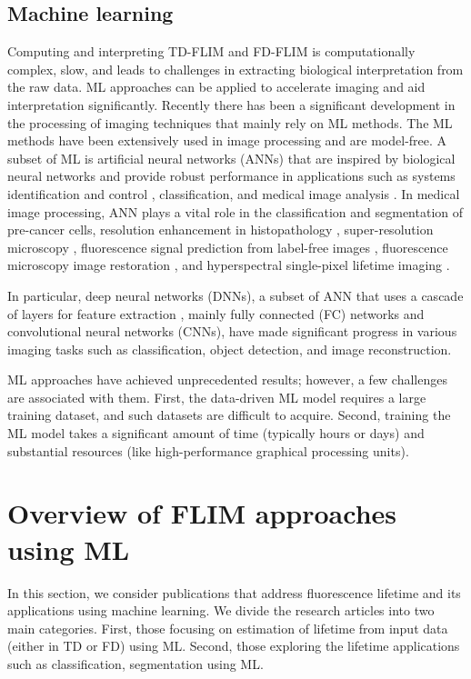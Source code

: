 \documentclass[12pt]{iopart}
\begin{document}
\subsection{Machine learning} \label{ml}
Computing and interpreting TD-FLIM and FD-FLIM is computationally complex, slow, and leads to challenges in extracting biological interpretation from the raw data. ML approaches can be applied to accelerate imaging and aid interpretation significantly. Recently there has been a significant development in the processing of imaging techniques that mainly rely on ML methods. The ML methods have been extensively used in image processing and are model-free. A subset of ML is artificial neural networks (ANNs) that are inspired by biological neural networks and provide robust performance in applications such as systems identification and control \cite{control_ann}, classification, and medical image analysis \cite{ann_medical}. In medical image processing, ANN plays a vital role in the classification and segmentation of pre-cancer cells, resolution enhancement in histopathology \cite{histopath_ann}, super-resolution microscopy \cite{sr_ann}, fluorescence signal prediction from label-free images \cite{label_free_ann}, fluorescence microscopy image restoration \cite{restoration_ann}, and hyperspectral single-pixel lifetime imaging \cite{netflics1}.

In particular, deep neural networks (DNNs), a subset of ANN that uses a cascade of layers for feature extraction \cite{goodfellow2016deep}, mainly fully connected (FC) networks and convolutional neural networks (CNNs), have made significant progress in various imaging tasks such as classification, object detection, and image reconstruction. 

ML approaches have achieved unprecedented results; however, a few challenges are associated with them. First, the data-driven ML model requires a large training dataset, and such datasets are difficult to acquire. Second, training the ML model takes a significant amount of time (typically hours or days) and substantial resources (like high-performance graphical processing units).

\section{Overview of FLIM approaches using ML} \label{section2}
In this section, we consider publications that address fluorescence lifetime and its applications using machine learning. We divide the research articles into two main categories. First, those focusing on estimation of lifetime from input data (either in TD or FD) using ML. Second, those exploring the lifetime applications such as classification, segmentation using ML.
\end{document}
